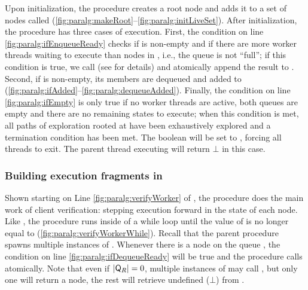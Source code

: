 Upon initialization, the procedure \nodeScheduler creates a root node
and adds it to a set of nodes called \liveSet
(\ref{fig:paralg:makeRoot}--\ref{fig:paralg:initLiveSet}). After
initialization, the procedure \nodeScheduler has three cases of
execution. First, the condition on line
\ref{fig:paralg:ifEnqueueReady} checks if \liveSet is non-empty and if
there are more worker threads waiting to execute than nodes in
\readyQ, i.e., the queue \readyQ is not ``full''; if this condition is
true, we call \selectNode (see  for details) and
atomically append the result to \readyQ. Second, if \addedQ is
non-empty, its members are dequeued and added to \liveSet
(\ref{fig:paralg:ifAdded}--\ref{fig:paralg:dequeueAdded}). Finally,
the condition on line \ref{fig:paralg:ifEmpty} is only true if no
worker threads are active, both queues are empty and there are no
remaining states to execute; when this condition is met, all paths of
exploration rooted at  have been exhaustively
explored and a termination condition has been met. The boolean
\verifyFinished will be set to \codeTrue, forcing all threads to exit.
The parent thread executing \parallelVerifyAlg will return $\bot$ in
this case.

\subsubsection{Building execution fragments in \verifyWorker}

Shown starting on Line \ref{fig:paralg:verifyWorker} of
, the procedure \verifyWorker does the main
work of client verification: stepping execution forward in the state \newState of
each node. Like \nodeScheduler, the procedure \verifyWorker runs
inside of a while loop until the value of \verifyFinished is no longer
equal to \codeFalse (\ref{fig:paralg:verifyWorkerWhile}). Recall that
the parent procedure \parallelVerifyAlg spawns multiple instances of
\verifyWorker. Whenever there is a node on the queue \readyQ, the
condition on line \ref{fig:paralg:ifDequeueReady} will be true and the
procedure calls \tryDequeue atomically. Note that even if $|\mathsf{Q}_{R}| =
0$, multiple instances of \verifyWorker may call \tryDequeue, but only
one will return a node, the rest will retrieve undefined ($\bot$) from
\tryDequeue. 

